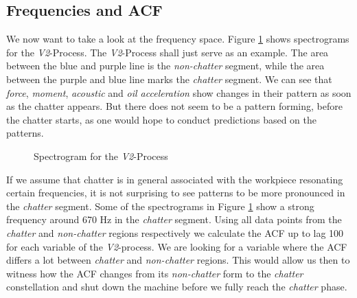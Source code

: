 \documentclass[12 pt]{scrartcl}
\begin{document}
\subsection{Frequencies and ACF}

We now want to take a look at the frequency space. Figure \ref{fig:v2-spec} shows spectrograms for the \emph{V2}-Process. The \emph{V2}-Process shall just serve as an example.
The area between the blue and purple line is the \emph{non-chatter} segment, while the area between the purple and blue line marks the \emph{chatter} segment. We can see that \emph{force}, \emph{moment}, \emph{acoustic} and \emph{oil acceleration} show changes in their pattern as soon as the chatter appears. But there does not seem to be a pattern forming, before the chatter starts, as one would hope to conduct predictions based on the patterns.

\begin{figure}[p]
  \caption{Spectrogram for the \emph{V2}-Process}
  \label{fig:v2-spec}
\end{figure}

If we assume that chatter is in general associated with the workpiece resonating certain frequencies, it is not surprising to see patterns to be more pronounced in the \emph{chatter} segment. Some of the spectrograms in Figure \ref{fig:v2-spec} show a strong frequency around 670 Hz in the \emph{chatter} segment. Using all data points from the \emph{chatter} and \emph{non-chatter} regions respectively we calculate the ACF up to lag 100 for each variable of the \emph{V2}-process. We are looking for a variable where the ACF differs a lot between \emph{chatter} and \emph{non-chatter} regions. This would allow us then to witness how the ACF changes from its \emph{non-chatter} form to the \emph{chatter} constellation and shut down the machine before we fully reach the \emph{chatter} phase.
\end{document}
